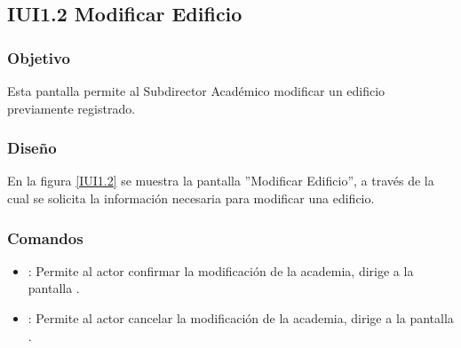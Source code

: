 \subsection{IUI1.2 Modificar Edificio}

\subsubsection{Objetivo}
	Esta pantalla permite al Subdirector Académico modificar un edificio previamente registrado.

\subsubsection{Diseño}
	En la figura \ref{IUI1.2} se muestra la pantalla ''Modificar Edificio'', a través de la cual se solicita la información necesaria para modificar una edificio.


\subsubsection{Comandos}
\begin{itemize}
	\item {}: Permite al actor confirmar la modificación de la academia, dirige a la pantalla .
	
	\item {}: Permite al actor cancelar la modificación de la academia, dirige a la pantalla .
\end{itemize}
